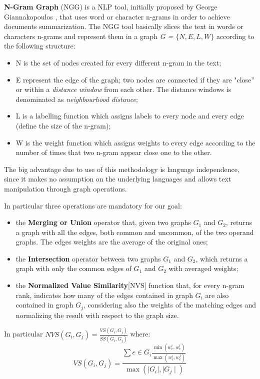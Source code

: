 \textbf{N-Gram Graph} (NGG) is a NLP tool, initially proposed by George Giannakopoulos \cite{Ngram}, that uses word or character n-grams in order to achieve documents summarization. The NGG tool basically slices the text in words or characters n-grams and represent them in a graph \emph{G = $\lbrace N,E,L,W\rbrace$} according to the following structure:
\begin{itemize}
	\item N is the set of nodes created for every different n-gram in the text;
	\item E represent the edge of the graph; two nodes are connected if they are "close'' or within a \emph{distance window} from each other. The distance windows is denominated as \emph{neighbourhood distance};
	\item L is a labelling function which assigns labels to every node and every edge (define the size of the n-gram);
	\item W is the weight function which assigns weights to every edge according to the number of times that two n-gram appear close one to the other.
\end{itemize}

The big advantage due to use of this methodology is language
independence, since it makes no assumption on the underlying languages and
allows text manipulation through graph operations.

In particular three operations are mandatory for our goal:
\begin{itemize}
	\item the \textbf{Merging or Union } operator that, given two graphs $G_1$ and $G_2$, returns a graph with all the edges, both common and uncommon, of the two operand graphs. The edges weights are the average of the original ones;
	\item the \textbf{Intersection} operator between two graphs $G_1$ and $G_2$, which returns a graph with only the common edges of $G_1$ and $G_2$ with averaged weights;
	\item the \textbf{Normalized Value Similarity}[NVS] function that, for every n-gram rank, indicates how many of the edges contained in graph $G_i$ are also contained in graph $G_j$, considering also the weights of the matching edges and normalizing the result with respect to the graph size.
\end{itemize}

In particular $NVS(G_i,G_j) = \frac{VS(G_i,G_j)}{SS(G_i,G_j)}$ where:
\begin{equation}
 VS(G_i,G_j)=\frac{\sum e \in G_i \frac{\min(w_e^i, w_e^j)}{\max(w_e^i, w_e^j)}}{\max(\mid G_i \mid, \mid G_j \mid)}
\end{equation}

